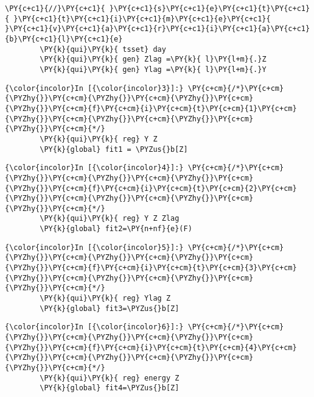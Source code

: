 \documentclass[11pt,notitlepage]{article}\usepackage[]{graphicx}\usepackage[]{color}
\makeatletter
\newenvironment{kframe}{%
 \def\at@end@of@kframe{}%
 \ifinner\ifhmode%
  \def\at@end@of@kframe{\end{minipage}}%
  \begin{minipage}{\columnwidth}%
 \fi\fi%
 \def\FrameCommand##1{\hskip\@totalleftmargin \hskip-\fboxsep
 \colorbox{shadecolor}{##1}\hskip-\fboxsep
     \hskip-\linewidth \hskip-\@totalleftmargin \hskip\columnwidth}%
 \MakeFramed {\advance\hsize-\width
   \@totalleftmargin\z@ \linewidth\hsize
   \@setminipage}}%
 {\par\unskip\endMakeFramed%
 \at@end@of@kframe}
\newenvironment{knitrout}{}{} %
\makeatother
\begin{document}
\begin{enumerate}[a)]
\begin{knitrout}
\begin{kframe}
\begin{Verbatim}[commandchars=\\\{\}]
        \PY{c+c1}{//}\PY{c+c1}{ }\PY{c+c1}{s}\PY{c+c1}{e}\PY{c+c1}{t}\PY{c+c1}{ }\PY{c+c1}{t}\PY{c+c1}{i}\PY{c+c1}{m}\PY{c+c1}{e}\PY{c+c1}{ }\PY{c+c1}{v}\PY{c+c1}{a}\PY{c+c1}{r}\PY{c+c1}{i}\PY{c+c1}{a}\PY{c+c1}{b}\PY{c+c1}{l}\PY{c+c1}{e}
        \PY{k}{qui}\PY{k}{ tsset} day
        \PY{k}{qui}\PY{k}{ gen} Zlag =\PY{k}{ l}\PY{l+m}{.}Z
        \PY{k}{qui}\PY{k}{ gen} Ylag =\PY{k}{ l}\PY{l+m}{.}Y
\end{Verbatim}

    \begin{Verbatim}[commandchars=\\\{\}]
{\color{incolor}In [{\color{incolor}3}]:} \PY{c+cm}{/*}\PY{c+cm}{\PYZhy{}}\PY{c+cm}{\PYZhy{}}\PY{c+cm}{\PYZhy{}}\PY{c+cm}{\PYZhy{}}\PY{c+cm}{f}\PY{c+cm}{i}\PY{c+cm}{t}\PY{c+cm}{1}\PY{c+cm}{\PYZhy{}}\PY{c+cm}{\PYZhy{}}\PY{c+cm}{\PYZhy{}}\PY{c+cm}{\PYZhy{}}\PY{c+cm}{*/}
        \PY{k}{qui}\PY{k}{ reg} Y Z
        \PY{k}{global} fit1 = \PYZus{}b[Z]
\end{Verbatim}

    \begin{Verbatim}[commandchars=\\\{\}]
{\color{incolor}In [{\color{incolor}4}]:} \PY{c+cm}{/*}\PY{c+cm}{\PYZhy{}}\PY{c+cm}{\PYZhy{}}\PY{c+cm}{\PYZhy{}}\PY{c+cm}{\PYZhy{}}\PY{c+cm}{f}\PY{c+cm}{i}\PY{c+cm}{t}\PY{c+cm}{2}\PY{c+cm}{\PYZhy{}}\PY{c+cm}{\PYZhy{}}\PY{c+cm}{\PYZhy{}}\PY{c+cm}{\PYZhy{}}\PY{c+cm}{*/}
        \PY{k}{qui}\PY{k}{ reg} Y Z Zlag
        \PY{k}{global} fit2=\PY{n+nf}{e}(F)
\end{Verbatim}

    \begin{Verbatim}[commandchars=\\\{\}]
{\color{incolor}In [{\color{incolor}5}]:} \PY{c+cm}{/*}\PY{c+cm}{\PYZhy{}}\PY{c+cm}{\PYZhy{}}\PY{c+cm}{\PYZhy{}}\PY{c+cm}{\PYZhy{}}\PY{c+cm}{f}\PY{c+cm}{i}\PY{c+cm}{t}\PY{c+cm}{3}\PY{c+cm}{\PYZhy{}}\PY{c+cm}{\PYZhy{}}\PY{c+cm}{\PYZhy{}}\PY{c+cm}{\PYZhy{}}\PY{c+cm}{*/}
        \PY{k}{qui}\PY{k}{ reg} Ylag Z
        \PY{k}{global} fit3=\PYZus{}b[Z]
\end{Verbatim}

    \begin{Verbatim}[commandchars=\\\{\}]
{\color{incolor}In [{\color{incolor}6}]:} \PY{c+cm}{/*}\PY{c+cm}{\PYZhy{}}\PY{c+cm}{\PYZhy{}}\PY{c+cm}{\PYZhy{}}\PY{c+cm}{\PYZhy{}}\PY{c+cm}{f}\PY{c+cm}{i}\PY{c+cm}{t}\PY{c+cm}{4}\PY{c+cm}{\PYZhy{}}\PY{c+cm}{\PYZhy{}}\PY{c+cm}{\PYZhy{}}\PY{c+cm}{\PYZhy{}}\PY{c+cm}{*/}
        \PY{k}{qui}\PY{k}{ reg} energy Z
        \PY{k}{global} fit4=\PYZus{}b[Z]
\end{Verbatim}


\end{kframe}
\end{knitrout}
\end{enumerate}
\end{document}
